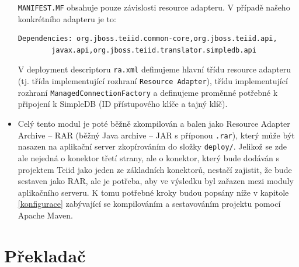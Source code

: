 \documentclass[oneside,12pt,final]{fithesis2}
\begin{document}
\begin{itemize}
 \texttt{MANIFEST.MF} obsahuje pouze závislosti resource adapteru. V případě našeho konkrétního adapteru je to:
 \begin{Verbatim}[fontsize=\small]
Dependencies: org.jboss.teiid.common-core,org.jboss.teiid.api,
	    javax.api,org.jboss.teiid.translator.simpledb.api
 \end{Verbatim}
 
 V deployment descriptoru \texttt{ra.xml} definujeme hlavní třídu resource adapteru (tj. třída implementující rozhraní \texttt{Resource Adapter}), třídu implementující rozhraní \texttt{ManagedConnectionFactory} a definujeme proměnné potřebné k připojení k SimpleDB (ID přístupového klíče a tajný klíč). 
 
 \item Celý tento modul je poté běžně zkompilován a balen jako Resource Adapter Archive -- RAR (běžný Java archive -- JAR s příponou \texttt{.rar}), který může být nasazen na aplikační server zkopírováním do složky \texttt{deploy/}. Jelikož se zde ale nejedná o konektor třetí strany, ale o konektor, který bude dodáván s projektem Teiid jako jeden ze základních konektorů, nestačí zajistit, že bude sestaven jako RAR, ale je potřeba, aby ve výsledku byl zařazen mezi moduly aplikačního serveru. K tomu potřebné kroky budou popsány níže v kapitole \ref{konfigurace} zabývající se kompilováním a sestavováním projektu pomocí Apache Maven.
\end{itemize}

\section{Překladač}
\end{document}
